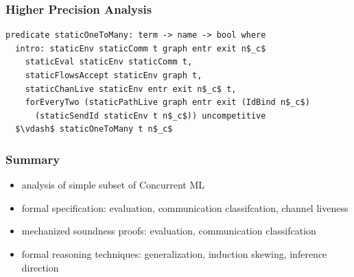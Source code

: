\documentclass{beamer}
\begin{document}
\begin{frame}[fragile]
\frametitle{Higher Precision Analysis}
\begin{lstlisting}[language=logic, mathescape]
predicate staticOneToMany: term -> name -> bool where
  intro: staticEnv staticComm t graph entr exit n$_c$ 
    staticEval staticEnv staticComm t,
    staticFlowsAccept staticEnv graph t,
    staticChanLive staticEnv entr exit n$_c$ t, 
    forEveryTwo (staticPathLive graph entr exit (IdBind n$_c$)
      (staticSendId staticEnv t n$_c$)) uncompetitive
  $\vdash$ staticOneToMany t n$_c$
\end{lstlisting}
\end{frame}

\begin{frame}[fragile]
\frametitle{Summary}
\begin{itemize}
\item analysis of simple subset of Concurrent ML
\item formal specification: evaluation, communication classifcation, channel liveness
\item mechanized soundness proofs: evaluation, communication classifcation 
\item formal reasoning techniques: generalization, induction skewing, inference direction 
\end{itemize}
\end{frame}
\end{document}
